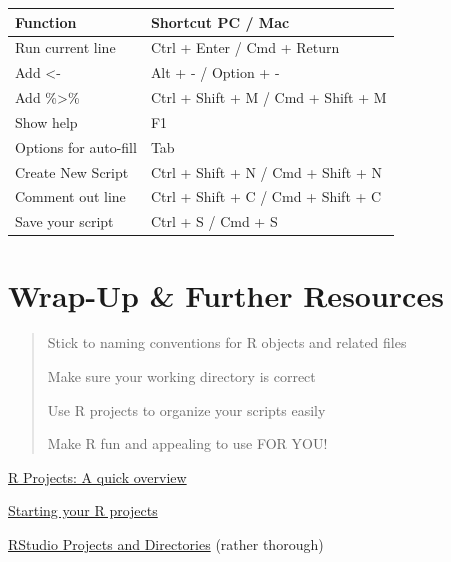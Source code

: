 \documentclass[
]{book}
\begin{document}
\begin{longtable}[]{@{}ll@{}}
\toprule\noalign{}
Function & Shortcut PC / Mac \\
\midrule\noalign{}
\endhead
\bottomrule\noalign{}
\endlastfoot
Run current line & Ctrl + Enter / Cmd + Return \\
Add \textless- & Alt + - / Option + - \\
Add \%\textgreater\% & Ctrl + Shift + M / Cmd + Shift + M \\
Show help & F1 \\
Options for auto-fill & Tab \\
Create New Script & Ctrl + Shift + N / Cmd + Shift + N \\
Comment out line & Ctrl + Shift + C / Cmd + Shift + C \\
Save your script & Ctrl + S / Cmd + S \\
\end{longtable}

\section{Wrap-Up \& Further Resources}\label{wrap-up-further-resources-1}

\begin{quote}
Stick to naming conventions for R objects and related files

Make sure your working directory is correct

Use R projects to organize your scripts easily

Make R fun and appealing to use FOR YOU!
\end{quote}

\href{https://thedavidchen.github.io/post/rstudio-why-use-projects/}{R Projects: A quick overview}

\href{https://bookdown.org/daniel_dauber_io/r4np_book/starting-your-r-projects.html}{Starting your R projects}

\href{https://martinctc.github.io/blog/rstudio-projects-and-working-directories-a-beginner's-guide/}{RStudio Projects and Directories} (rather thorough)
\end{document}
